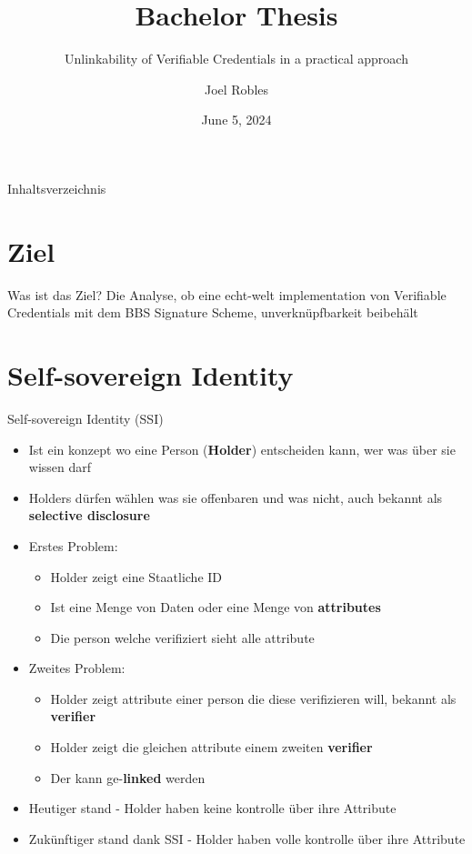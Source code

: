 \documentclass[
	german,%
	authorontitle=true,
	]{bfhbeamer}
\title{Bachelor Thesis}
\subtitle{Unlinkability of Verifiable Credentials in a practical approach}
\author[J. Robles]{Joel Robles}
\institute{TI}
\date{June 5, 2024}
\begin{document}
\maketitle

\begin{frame}{Inhaltsverzeichnis}
    \tableofcontents
\end{frame}

\section{Ziel}

\begin{frame}{Was ist das Ziel?}
    \centering
    Die Analyse, ob eine echt-welt implementation von Verifiable Credentials mit dem BBS Signature Scheme, unverknüpfbarkeit beibehält
\end{frame}

\section{Self-sovereign Identity}

\begin{frame}{Self-sovereign Identity (SSI)}
    \begin{itemize}
        \item Ist ein konzept wo eine Person (\textbf{Holder}) entscheiden kann, wer was über sie wissen darf
        \item Holders dürfen wählen was sie offenbaren und was nicht, auch bekannt als \textbf{selective disclosure}
        \item Erstes Problem:
        \begin{itemize}
            \item Holder zeigt eine Staatliche ID
            \item Ist eine Menge von Daten oder eine Menge von \textbf{attributes}
            \item Die person welche verifiziert sieht alle attribute
        \end{itemize}
        \item Zweites Problem:
        \begin{itemize}
            \item Holder zeigt attribute einer person die diese verifizieren will, bekannt als \textbf{verifier}
            \item Holder zeigt die gleichen attribute einem zweiten \textbf{verifier}
            \item Der kann ge-\textbf{linked} werden
        \end{itemize}
        \item Heutiger stand - Holder haben keine kontrolle über ihre Attribute
        \item Zukünftiger stand dank SSI - Holder haben volle kontrolle über ihre Attribute
    \end{itemize}
\end{frame}
\end{document}
